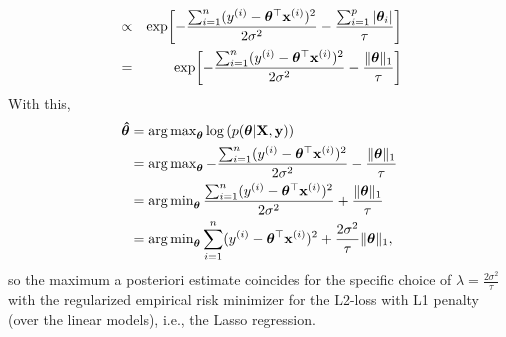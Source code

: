 \documentclass[a4paper]{article}
\begin{document}
{\begin{enumerate}
\begin{eqnarray*}
		&\propto& \exp\biggl[-\frac{ \sum_{i=1}^n (y^{(i)} - \bm{\theta}^\top \mathbf{x}^{(i)})^2}{2\sigma^2} -\frac{\sum_{i=1}^p |\bm{\theta}_i|}{\tau}  \biggr] \\
		&=& \exp\biggl[-\frac{ \sum_{i=1}^n (y^{(i)} - \bm{\theta}^\top \mathbf{x}^{(i)})^2}{2\sigma^2} -\frac{\|\bm{\theta}\|_1}{\tau}  \biggr]
	\end{eqnarray*}
	With this, 
	\begin{align*}
		\bm{\hat\theta} 
		&= \operatorname{arg\,max}_{\bm{\theta}} \log \left( p(\bm{\theta} | \mathbf{X}, \mathbf{y}) \right) \\
		&= \operatorname{arg\,max}_{\bm{\theta}} -\frac{ \sum_{i=1}^n (y^{(i)} - \bm{\theta}^\top \mathbf{x}^{(i)})^2}{2\sigma^2} -\frac{\|\bm{\theta}\|_1}{\tau}   \\
		&= \operatorname{arg\,min}_{\bm{\theta}}  \frac{ \sum_{i=1}^n (y^{(i)} - \bm{\theta}^\top \mathbf{x}^{(i)})^2}{2\sigma^2} + \frac{\|\bm{\theta}\|_1}{\tau}  \\
		&= \operatorname{arg\,min}_{\bm{\theta}}   \sum_{i=1}^n (y^{(i)} - \bm{\theta}^\top \mathbf{x}^{(i)})^2  + \frac{2\sigma^2}{ \tau}  \|\bm{\theta}\|_1   ,
	\end{align*}
	so the  maximum a posteriori estimate coincides for the specific choice of $\lambda = \frac{2\sigma^2}{ \tau}$ with the regularized empirical risk minimizer for the L2-loss with L1 penalty (over the linear models), i.e., the Lasso regression.
%	
\end{enumerate}
%
}
\end{document}
